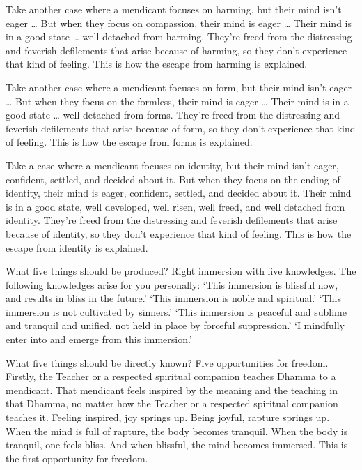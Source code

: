 \documentclass[12pt,openany]{book}%
\begin{document}
Take another case where a mendicant focuses on harming, but their mind isn’t eager … But when they focus on compassion, their mind is eager … Their mind is in a good state … well detached from harming. They’re freed from the distressing and feverish defilements that arise because of harming, so they don’t experience that kind of feeling. This is how the escape from harming is explained. 

Take another case where a mendicant focuses on form, but their mind isn’t eager … But when they focus on the formless, their mind is eager … Their mind is in a good state … well detached from forms. They’re freed from the distressing and feverish defilements that arise because of form, so they don’t experience that kind of feeling. This is how the escape from forms is explained. 

Take a case where a mendicant focuses on identity, but their mind isn’t eager, confident, settled, and decided about it. But when they focus on the ending of identity, their mind is eager, confident, settled, and decided about it. Their mind is in a good state, well developed, well risen, well freed, and well detached from identity. They’re freed from the distressing and feverish defilements that arise because of identity, so they don’t experience that kind of feeling. This is how the escape from identity is explained. 

What five things should be produced? Right immersion with five knowledges. The following knowledges arise for you personally: ‘This immersion is blissful now, and results in bliss in the future.’ ‘This immersion is noble and spiritual.’ ‘This immersion is not cultivated by sinners.’ ‘This immersion is peaceful and sublime and tranquil and unified, not held in place by forceful suppression.’ ‘I mindfully enter into and emerge from this immersion.’ 

What five things should be directly known? Five opportunities for freedom. Firstly, the Teacher or a respected spiritual companion teaches Dhamma to a mendicant. That mendicant feels inspired by the meaning and the teaching in that Dhamma, no matter how the Teacher or a respected spiritual companion teaches it. Feeling inspired, joy springs up. Being joyful, rapture springs up. When the mind is full of rapture, the body becomes tranquil. When the body is tranquil, one feels bliss. And when blissful, the mind becomes immersed. This is the first opportunity for freedom. 
\end{document}
